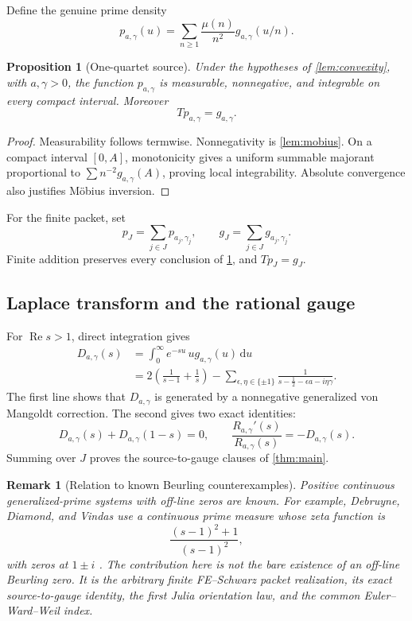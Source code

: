 \documentclass[11pt]{article}
\newtheorem{proposition}[theorem]{Proposition}
\newtheorem{remark}[theorem]{Remark}
\newcommand{\re}{\operatorname{Re}}
\newcommand{\dd}{\,\mathrm d}
\begin{document}
Define the genuine prime density
\[
 p_{a,\gamma}(u)
 =\sum_{n\geq1}\frac{\mu(n)}{n^2}
     g_{a,\gamma}(u/n).
\]

\begin{proposition}[One-quartet source]
\label{prop:source}
Under the hypotheses of \cref{lem:convexity}, with \(a,\gamma>0\),
the function \(p_{a,\gamma}\) is measurable, nonnegative, and integrable
on every compact interval.  Moreover
\[
 Tp_{a,\gamma}=g_{a,\gamma}.
\]
\end{proposition}

\begin{proof}
Measurability follows termwise.  Nonnegativity is
\cref{lem:mobius}.  On a compact interval \([0,A]\), monotonicity gives
a uniform summable majorant proportional to
\(\sum n^{-2}g_{a,\gamma}(A)\), proving local integrability.
Absolute convergence also justifies M\"obius inversion.
\end{proof}

For the finite packet, set
\[
 p_J=\sum_{j\in J}p_{a_j,\gamma_j},
 \qquad
 g_J=\sum_{j\in J}g_{a_j,\gamma_j}.
\]
Finite addition preserves every conclusion of
\cref{prop:source}, and \(Tp_J=g_J\).

\subsection{Laplace transform and the rational gauge}

For \(\re s>1\), direct integration gives
\[
\begin{aligned}
D_{a,\gamma}(s)
&=\int_0^\infty e^{-su}\,u g_{a,\gamma}(u)\dd u\\
&=2\left(\frac1{s-1}+\frac1s\right)
 -\sum_{\epsilon,\eta\in\{\pm1\}}
  \frac1{s-\frac12-\epsilon a-i\eta\gamma}.
\end{aligned}
\]
The first line shows that \(D_{a,\gamma}\) is generated by a
nonnegative generalized von Mangoldt correction.  The second gives two
exact identities:
\[
 D_{a,\gamma}(s)+D_{a,\gamma}(1-s)=0,
 \qquad
 \frac{R_{a,\gamma}'(s)}{R_{a,\gamma}(s)}
 =-D_{a,\gamma}(s).
\]
Summing over \(J\) proves the source-to-gauge clauses of
\cref{thm:main}.

\begin{remark}[Relation to known Beurling counterexamples]
Positive continuous generalized-prime systems with off-line zeros are
known.  For example, Debruyne, Diamond, and Vindas use a continuous prime
measure whose zeta function is
\[
 \frac{(s-1)^2+1}{(s-1)^2},
\]
with zeros at \(1\pm i\) \cite[Example~4.3]{DebruyneDiamondVindas2018}.
The contribution here is not the bare existence of an off-line Beurling
zero.  It is the arbitrary finite FE--Schwarz packet realization, its
exact source-to-gauge identity, the first Julia orientation law, and the
common Euler--Ward--Weil index.
\end{remark}
\end{document}
